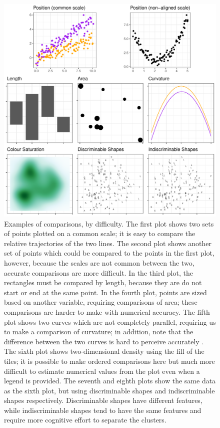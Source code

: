 \documentclass[letterpaper]{ar-1col}\usepackage[]{graphicx}\usepackage[]{color}
\newenvironment{knitrout}{}{} %
\begin{document}
\begin{knitrout}
\color{fgcolor}\begin{figure}
\includegraphics[width=\textwidth]{figure/comparison-ranking-1} \caption[Examples of comparisons, by difficulty]{Examples of comparisons, by difficulty. The first plot shows two sets of points plotted on a common scale; it is easy to compare the relative trajectories of the two lines. The second plot shows another set of points which could be compared to the points in the first plot, however, because the scales are not common between the two, accurate comparisons are more difficult. In the third plot, the rectangles must be compared by length, because they are do not start or end at the same point. In the fourth plot, points are sized based on another variable, requiring comparisons of area; these comparisons are harder to make with numerical accuracy. The fifth plot shows two curves which are not completely parallel, requiring us to make a comparison of curvature; in addition, note that the difference between the two curves is hard to perceive accurately \citep{vanderplas_signs_2015}. The sixth plot shows two-dimensional density using the fill of the tiles; it is possible to make ordered comparisons here but much more difficult to estimate numerical values from the plot even when a legend is provided. The seventh and eighth plots show the same data as the sixth plot, but using discriminable shapes and indiscriminable shapes respectively. Discriminable shapes have different features, while indiscriminable shapes tend to have the same features and require more cognitive effort to separate the clusters.}\label{fig:comparison-ranking}
\end{figure}


\end{knitrout}
\end{document}
